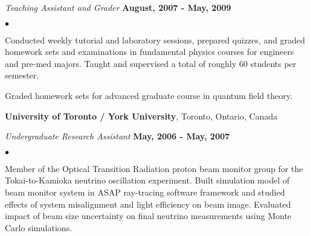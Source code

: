 \documentclass[margin,line]{res}
\newenvironment{list2}{
  \begin{list}{$\bullet$}{%
      \setlength{\itemsep}{0in}
      \setlength{\parsep}{0in} \setlength{\parskip}{0in}
      \setlength{\topsep}{0in} \setlength{\partopsep}{0in}
      \setlength{\leftmargin}{0.2in}}}{\end{list}}
\begin{document}
\begin{resume}
\vspace*{-0.15in}
{\em Teaching Assistant and Grader} \hfill {\bf August, 2007 - May, 2009}\\
\begin{list2}
\item Conducted weekly tutorial and laboratory sessions, prepared
  quizzes, and graded homework sets and examinations in fundamental
  physics courses for engineers and pre-med majors.  Taught and
  supervised a total of roughly 60 students per semester.
\item Graded homework sets for advanced graduate course in quantum field theory.
\end{list2}

\newpage

{\bf University of Toronto / York University}, Toronto, Ontario, Canada

\vspace{-.3cm}
{\em Undergraduate Research Assistant} \hfill {\bf May, 2006 - May, 2007}\\
\vspace*{-2mm}
\begin{list2}
\item Member of the Optical Transition Radiation proton beam
  monitor group for the Tokai-to-Kamioka neutrino oscillation
  experiment. Built simulation model of beam monitor system in
  ASAP\textsuperscript{\texttrademark} ray-tracing software framework
  and studied effects of system misalignment and light efficiency on
  beam image. Evaluated impact of beam size uncertainty on final neutrino
  measurements using Monte Carlo simulations.


\end{list2}
\end{resume}
\end{document}
